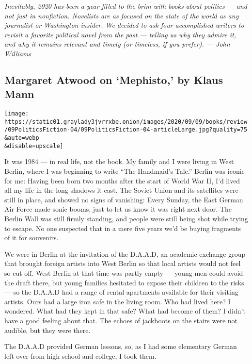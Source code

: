 \emph{Inevitably, 2020 has been a year filled to the brim with books
about politics --- and not just in nonfiction. Novelists are as focused
on the state of the world as any journalist or Washington insider. We
decided to ask four accomplished writers to revisit a favorite political
novel from the past --- telling us why they admire it, and why it
remains relevant and timely (or timeless, if you prefer). --- John
Williams}

\hypertarget{margaret-atwood-on-mephisto-by-klaus-mann}{%
\subsection{Margaret Atwood on `Mephisto,' by Klaus
Mann}\label{margaret-atwood-on-mephisto-by-klaus-mann}}

\texttt{[image: https://static01.graylady3jvrrxbe.onion/images/2020/09/09/books/review/09PoliticsFiction-04/09PoliticsFiction-04-articleLarge.jpg?quality=75\\\&auto=webp\\\&disable=upscale]}

It was 1984 --- in real life, not the book. My family and I were living
in West Berlin, where I was beginning to write ``The Handmaid's Tale.''
Berlin was iconic for me: Having been born two months after the start of
World War II, I'd lived all my life in the long shadows it cast. The
Soviet Union and its satellites were still in place, and showed no signs
of vanishing: Every Sunday, the East German Air Force made sonic booms,
just to let us know it was right next door. The Berlin Wall was still
firmly standing, and people were still being shot while trying to
escape. No one suspected that in a mere five years we'd be buying
fragments of it for souvenirs.

We were in Berlin at the invitation of the D.A.A.D, an academic exchange
group that brought foreign artists into West Berlin so that local
artists would not feel so cut off. West Berlin at that time was partly
empty --- young men could avoid the draft there, but young families
hesitated to expose their children to the risks --- so the D.A.A.D had a
range of rental apartments available for their visiting artists. Ours
had a large iron safe in the living room. Who had lived here? I
wondered. What had they kept in that safe? What had become of them? I
didn't have a good feeling about that. The echoes of jackboots on the
stairs were not audible, but they were there.

The D.A.A.D provided German lessons, so, as I had some elementary German
left over from high school and college, I took them.


